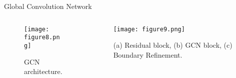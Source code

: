 \documentclass[10pt,aspectratio=169,dvipsnames]{beamer} %
\begin{document}
	\begin{frame}{Global Convolution Network}
		\begin{columns}[T]
			\begin{column}[c]{0.55\textwidth}
				\begin{figure}
					\centering
					\texttt{[image: figure8.png]}
					\caption{GCN architecture.} 
				\end{figure}	
			\end{column}
			\begin{column}[c]{0.45\textwidth}
				\begin{figure}
					\centering
					\texttt{[image: figure9.png]}
					\caption{(a) Residual block, (b) GCN block, (c) Boundary Refinement.} 
				\end{figure}	
			\end{column}
		\end{columns}
	\end{frame}	
			
	\setcounter{subfigure}{0}
\end{document}

